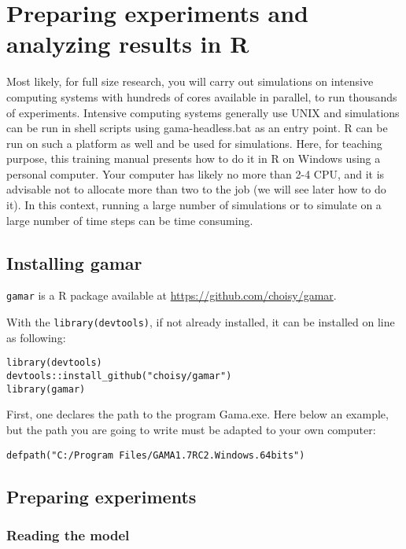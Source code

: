 \chapter{Preparing experiments and analyzing results in R}
\label{chap:Preparing experiments}

Most likely, for full size research, you will carry out simulations on intensive computing systems with hundreds of cores available  in parallel, to run thousands of experiments. Intensive computing systems generally use UNIX and simulations can be run in shell scripts using gama-headless.bat as an entry point. R can be run on such a platform as well and be used for simulations. Here, for teaching purpose, this training manual presents how to do it in R on Windows using a personal computer. Your computer has likely no more than 2-4 CPU, and it is advisable not to allocate more than two to the job (we will see later how to do it). In this context, running a large number of simulations or to simulate on a large number of time steps can be time consuming.

\section{Installing gamar}
\texttt{gamar} is a R package  available at \url{https://github.com/choisy/gamar}.

With the \texttt{library(devtools)}, if not already installed, it can be installed on line as following:

\begin{lstlisting}
library(devtools)
devtools::install_github("choisy/gamar")
library(gamar)
\end{lstlisting}

First, one declares the path to the program Gama.exe. Here below an example, but the path you are going to write must be adapted to your own computer:

\begin{lstlisting}
defpath("C:/Program Files/GAMA1.7RC2.Windows.64bits")
\end{lstlisting}

\section{Preparing experiments}


\subsection{Reading the model}

